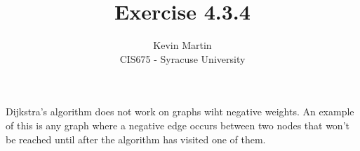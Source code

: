 \documentclass{article}
\author{Kevin Martin\\ CIS675 - Syracuse University}
\title{Exercise 4.3.4}
\begin{document}
\maketitle
Dijkstra's algorithm does not work on graphs wiht negative weights. 
An example of this is any graph where a negative edge occurs between
two nodes that won't be reached until after the algorithm has visited
one of them.
\end{document}
